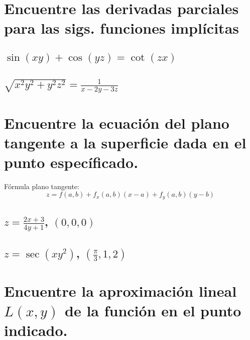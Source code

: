 \documentclass{article}
\begin{document}

\section{Encuentre las derivadas parciales para las sigs. funciones implícitas}


\subsection{$\displaystyle \sin(xy)+\cos(yz)=\cot(zx)$}

\subsection{$\displaystyle \sqrt{x^2y^2+y^2z^2}=\frac{1}{x-2y-3z} $}




\section{Encuentre la ecuación del plano tangente a la superficie dada en el punto específicado.}
Fórmula plano tangente: 
\[
    z = f(a,b)+f_x(a,b)(x-a)+f_y(a,b)(y-b)
\]

\subsection{$\displaystyle z = \frac{2x+3}{4y+1} $, $(0,0,0)$}

\subsection{$\displaystyle z=\sec(xy^2)$, $\left(\frac{\pi }{3},1,2\right)$}



\section{Encuentre la aproximación lineal $L(x,y)$ de la función en el punto indicado.}
\end{document}
